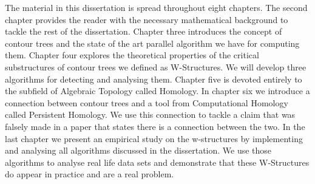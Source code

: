 The material in this dissertation is spread throughout eight chapters. The second chapter provides the reader with the necessary mathematical background to tackle the rest of the dissertation. Chapter three introduces the concept of contour trees and the state of the art parallel algorithm we have for computing them. Chapter four explores the theoretical properties of the critical substructures of contour trees we defined as W-Structures. We will develop three algorithms for detecting and analysing them. Chapter five is devoted entirely to the subfield of Algebraic Topology called Homology. In chapter six we introduce a connection between contour trees and a tool from Computational Homology called Persistent Homology. We use this connection to tackle a claim that was falsely made in a paper that states there is a connection between the two. In the last chapter we present an empirical study on the w-structures by implementing and analysing all algorithms discussed in the dissertation. We use those algorithms to analyse real life data sets and demonstrate that these W-Structures do appear in practice and are a real problem.






